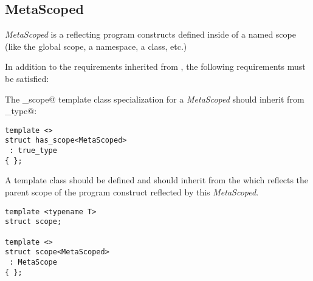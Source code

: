 \subsection{MetaScoped}
\label{concept-MetaScoped}

{\em MetaScoped} is a  reflecting program constructs defined inside
of a named scope (like the global scope, a namespace, a class, etc.)

In addition to the requirements inherited from , the following requirements must
be satisfied:

The \verb@has_scope@ template class specialization for a {\em MetaScoped} should
inherit from \verb@true_type@:

\begin{lstlisting}
template <>
struct has_scope<MetaScoped>
 : true_type
{ };
\end{lstlisting}

A template class \verb@scope@ should be defined and should inherit from the
 which reflects the parent scope of the program construct reflected
by this {\em MetaScoped}.

\begin{lstlisting}
template <typename T>
struct scope;

template <>
struct scope<MetaScoped>
 : MetaScope
{ };
\end{lstlisting}

